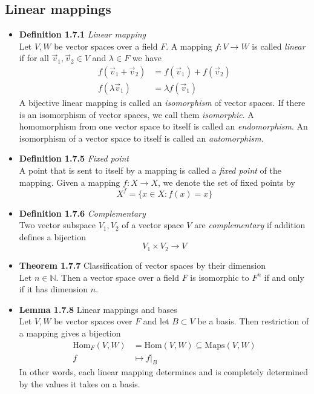 \documentclass[11pt,a4paper]{article}
\begin{document}
\subsection{Linear mappings}

\begin{itemize}

    \item \textbf{Definition 1.7.1} \emph{Linear mapping} \\
        Let $V,W$ be vector spaces over a field $F$.
        A mapping $f: V \to W$ is called \emph{linear}
        if for all $\vec{v}_1, \vec{v}_2 \in V$ and $\lambda \in F$ we have
        \begin{align*}{}
            f(\vec{v}_1 + \vec{v}_2) & = f(\vec{v}_1) + f(\vec{v}_2) \\
            f(\lambda\vec{v}_1)         & = \lambda f(\vec{v}_1)
        \end{align*}
        A bijective linear mapping is called an \emph{isomorphism} of vector spaces.
        If there is an isomorphism of vector spaces, we call them \emph{isomorphic}.
        A homomorphism from one vector space to itself is called an \emph{endomorphism}.
        An isomorphism of a vector space to itself is called an \emph{automorphism}.

    \item \textbf{Definition 1.7.5} \emph{Fixed point} \\
        A point that is sent to itself by a mapping is called a \emph{fixed point} of the
        mapping.
        Given a mapping $f: X \to X$, we denote the set of fixed points by
        \[
            X^f = \{x \in X : f(x) = x\}
        \]

    \item \textbf{Definition 1.7.6} \emph{Complementary} \\
        Two vector subspace $V_1, V_2$ of a vector space $V$ are \emph{complementary} if
        addition defines a bijection
        \[
            V_1 \times V_2 \to V
        \]

    \item \textbf{Theorem 1.7.7} Classification of vector spaces by their dimension \\
        Let $n \in \mathbb{N}$.
        Then a vector space over a field $F$ is isomorphic to $F^n$ if and only if it has
        dimension $n$.

    \item \textbf{Lemma 1.7.8} Linear mappings and bases \\
        Let $V,W$ be vector spaces over $F$ and let $B \subset V$ be a basis.
        Then restriction of a mapping gives a bijection
        \begin{align*}{}
            \text{Hom}_F(V,W) & = \text{Hom}(V,W) \subseteq \text{Maps}(V,W) \\
            f                 & \mapsto f|_B
        \end{align*}
        In other words, each linear mapping determines and is completely determined by the
        values it takes on a basis.


\end{itemize}
\end{document}
